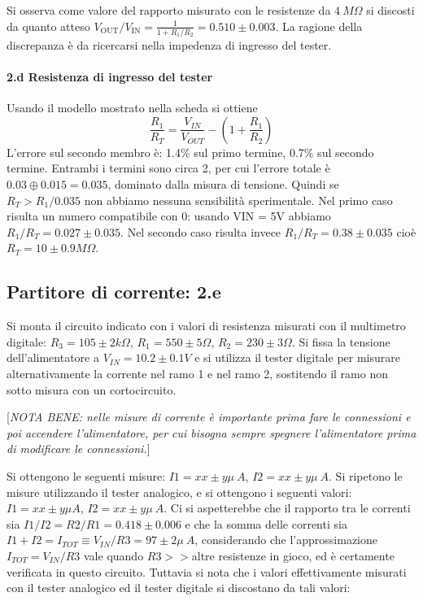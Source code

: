 \documentclass[10pt,a4paper]{article}
\newcommand{\rem}[1]{[\emph{#1}]}
\begin{document}
Si osserva come valore del rapporto misurato con le resistenze da $4~M\Omega$ si discosti da quanto atteso   $V_\mathrm{OUT}/V_\mathrm{IN} = \frac{1}{1+R_1/R_2}= 0.510\pm 0.003 $. La ragione della discrepanza \`e da ricercarsi nella impedenza di ingresso del tester.


\paragraph{2.d Resistenza di ingresso del tester}

 Usando il modello mostrato nella scheda si ottiene
\[ \frac{R_1}{R_T} =  \frac{V_{IN}}{V_{OUT}} - (1 +  \frac{R_1}{R_2} )
\]
L'errore sul secondo membro \`e: 1.4\% sul primo termine, 0.7\% sul secondo termine. Entrambi i termini sono circa 2, per cui l'errore totale \`e $ 0.03 \oplus 0.015 = 0.035$, dominato dalla misura di tensione. Quindi se  $R_T > R_1/0.035 $ non abbiamo nessuna sensibilit\`a sperimentale. 
Nel primo caso risulta un numero compatibile con 0: usando VIN = 5V abbiamo $R_1/R_T =0.027 \pm 0.035 $.
Nel secondo caso risulta invece $R_1/R_T =0.38 \pm 0.035 $ cio\`e $ R_T = 10 \pm 0.9 M\Omega$.

\subsection{Partitore di corrente: 2.e}

Si monta il circuito indicato con i valori di resistenza misurati con il multimetro digitale: 
$R_3= 105\pm 2 k\Omega$, $R_1 = 550\pm 5 \Omega$, $R_2 = 230\pm 3 \Omega$.
Si fissa la tensione dell'alimentatore a $V_{IN}=10.2 \pm 0.1 V$ e si utilizza il tester digitale per misurare alternativamente la corrente nel ramo 1 e nel ramo 2, sostitendo il ramo non sotto misura con un cortocircuito. 

\rem{NOTA BENE: nelle misure di corrente \`e importante prima fare le connessioni e poi accendere l'alimentatore, per cui bisogna sempre spegnere l'alimentatore prima di modificare le connessioni.}

Si ottengono le seguenti misure: $I1 = xx \pm y \mu ~A $, $I2 = xx \pm y \mu ~A $. 
Si ripetono le misure utilizzando il tester analogico, e si ottengono i seguenti valori:
$I1 = xx \pm y \mu A $, $I2 = xx \pm y \mu ~A $. 
Ci si aspetterebbe che il rapporto tra le correnti sia $I1/I2 = R2/R1 = 0.418 \pm 0.006$ e che la somma delle correnti sia $I1 + I2 = I_{TOT} \equiv V_{IN}/R3 = 97 \pm 2 \mu~A$, considerando che l'approssimazione $I_{TOT}=V_{IN}/R3$ vale quando $R3>>$altre resistenze in gioco, ed \`e certamente verificata in questo circuito. 
Tuttavia si nota che i valori effettivamente misurati con il tester analogico ed il tester digitale si discostano da tali valori:
\end{document}
